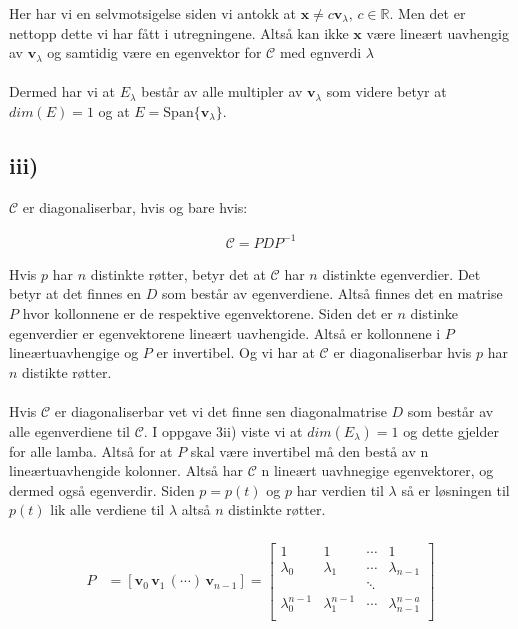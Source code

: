 \documentclass[a4paper, norsk, twoside, 10pt]{article}
\begin{document}
\begin{flushleft}
Her har vi en selvmotsigelse siden vi antokk at $\mathbf{x}  \neq c\mathbf{v}_{\lambda}, \, c \in \mathbb{R}$. Men det er nettopp dette vi har fått i utregningene. Altså kan ikke $\mathbf{x}$ være lineært uavhengig av $\mathbf{v}_{\lambda}$ og samtidig være en egenvektor for $\mathcal{C}$ med egnverdi $\lambda$  \\ \ \\

Dermed har vi at $E_{\lambda}$ består av alle multipler av $\mathbf{v}_{\lambda}$ som videre betyr at $dim(E) = 1$ og at $E = \text{Span}\{\mathbf{v}_{\lambda}\}$.


\subsection*{iii)}

$\mathcal{C}$ er diagonaliserbar, hvis og bare hvis:

\begin{align*}
  \mathcal{C} = PDP^{-1}
\end{align*}

Hvis $p$ har $n$ distinkte røtter, betyr det at $\mathcal{C}$ har $n$ distinkte egenverdier. Det betyr at det finnes en $D$ som består av egenverdiene. Altså finnes det en matrise $P$ hvor kollonnene er de respektive egenvektorene. Siden det er $n$ distinke egenverdier er egenvektorene lineært uavhengide. Altså er kollonnene i $P$ lineærtuavhengige og $P$ er invertibel. Og vi har at $\mathcal{C}$ er diagonaliserbar hvis $p$ har $n$ distikte røtter.
\\ \ \\
Hvis $\mathcal{C}$ er diagonaliserbar vet vi det finne sen diagonalmatrise $D$ som består av alle egenverdiene til $\mathcal{C}$. I oppgave 3ii) viste vi at $dim(E_{\lambda}) = 1$ og dette gjelder for alle lamba. Altså for at $P$ skal være invertibel må den bestå av n lineærtuavhengide kolonner. Altså har $\mathcal{C}$ n lineært uavhnegige egenvektorer, og dermed også egenverdir. Siden $p = p(t)$ og $p$ har verdien til $\lambda$ så er løsningen til $p(t)$ lik alle verdiene til $\lambda$ altså $n$ distinkte røtter. 
\\ \ \\
\begin{align*}
  P &= [\mathbf{v}_{0} \, \mathbf{v}_{1} \, (\cdots) \, \mathbf{v}_{n-1} ]  =
  \begin{bmatrix}
    1 & 1  & \cdots & 1 \\
    \lambda_0 & \lambda_1 & \cdots & \lambda_{n-1} \\
    & & \ddots& \\
    \lambda^{n-1}_{0} & \lambda^{n-1}_{1} & \cdots & \lambda^{n-a}_{n-1} \\
  \end{bmatrix}\\
\end{align*}

\end{flushleft}
\end{document}
